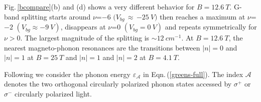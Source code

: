 \documentclass[prl,aps,superscriptaddress,showpacs,reprint]{revtex4-1}
\begin{document}
Fig.\,\ref{bcompare}(b) and (d) shows a very different behavior for $B=12.6\: T$.
G-band splitting starts around $\nu$=$-6$ $(V_{bg}$\,$\approx$\,$-25\: V)$ then reaches a maximum at $\nu$=$-2$ $(V_{bg}\approx-9\: V)$, disappears at $\nu$=$0$ $(V_{bg} = 0\: V)$ and repeats symmetrically for $\nu>0$.
The largest magnitude of the splitting is $\sim 12\: cm^{-1}$. At $B=12.6\: T$, the nearest magneto-phonon resonances are the transitions between $\left|n\right|=0$ and $\left|n\right|=1$ at $B=25\: T$ and $\left|n\right|=1$ and $\left|n\right|=2$ at $B=4.1\: T$.


Following \cite{goerbig2007filling,ando2007magnetic,kossacki2012circular} we consider the phonon energy $\varepsilon_{\mathcal{A}}$ in Eqn.\,(\ref{greens-full}). The index $\mathcal{A}$ denotes the two orthogonal circularly polarized phonon states accessed by $\sigma^+$ or $\sigma^-$ circularly polarized light.
\end{document}
